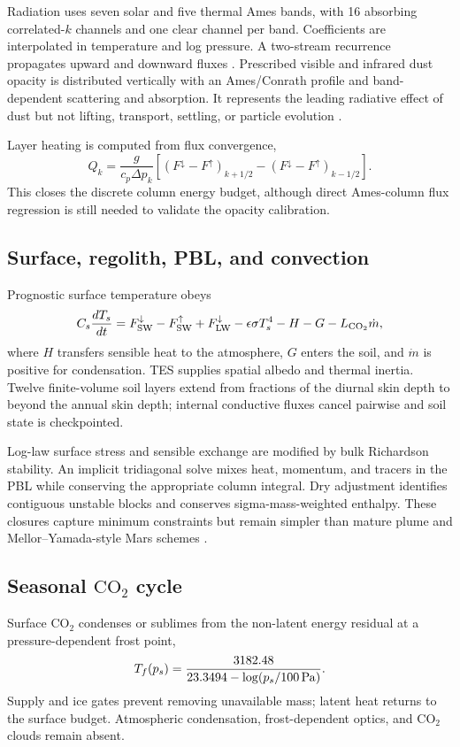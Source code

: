\documentclass{article}
\begin{document}
Radiation uses seven solar and five thermal Ames bands, with 16 absorbing
correlated-\(k\) channels and one clear channel per band. Coefficients are
interpolated in temperature and log pressure. A two-stream recurrence propagates
upward and downward fluxes \citep{toon1989twostream}. Prescribed visible and
infrared dust opacity is distributed vertically with an Ames/Conrath profile and
band-dependent scattering and absorption. It represents the leading radiative
effect of dust but not lifting, transport, settling, or particle evolution
\citep{madeleine2011dust}.

Layer heating is computed from flux convergence,
\begin{equation}
Q_k=\frac{g}{c_p\Delta p_k}\left[(F^\downarrow-F^\uparrow)_{k+1/2}
-(F^\downarrow-F^\uparrow)_{k-1/2}\right].
\end{equation}
This closes the discrete column energy budget, although direct Ames-column flux
regression is still needed to validate the opacity calibration.

\subsection{Surface, regolith, PBL, and convection}
Prognostic surface temperature obeys
\begin{equation}
C_s\frac{dT_s}{dt}=F^\downarrow_{\rm SW}-F^\uparrow_{\rm SW}
+F^\downarrow_{\rm LW}-\epsilon\sigma T_s^4-H-G-L_{\rm CO_2}\dot m,
\end{equation}
where \(H\) transfers sensible heat to the atmosphere, \(G\) enters the soil,
and \(\dot m\) is positive for condensation. TES supplies spatial albedo and
thermal inertia. Twelve finite-volume soil layers extend from fractions of the
diurnal skin depth to beyond the annual skin depth; internal conductive fluxes
cancel pairwise and soil state is checkpointed.

Log-law surface stress and sensible exchange are modified by bulk Richardson
stability. An implicit tridiagonal solve mixes heat, momentum, and tracers in the
PBL while conserving the appropriate column integral. Dry adjustment identifies
contiguous unstable blocks and conserves sigma-mass-weighted enthalpy. These
closures capture minimum constraints but remain simpler than mature plume and
Mellor--Yamada-style Mars schemes
\citep{forget1999improved,haberle2019ames,colaitis2013pbl}.

\subsection{Seasonal \texorpdfstring{\(\mathrm{CO_2}\)}{CO2} cycle}
Surface \(\mathrm{CO_2}\) condenses or sublimes from the non-latent energy
residual at a pressure-dependent frost point,
\begin{equation}
T_f(p_s)=\frac{3182.48}{23.3494-\log(p_s/100\,{\rm Pa})}.
\end{equation}
Supply and ice gates prevent removing unavailable mass; latent heat returns to
the surface budget. Atmospheric condensation, frost-dependent optics, and
\(\mathrm{CO_2}\) clouds remain absent.
\end{document}
